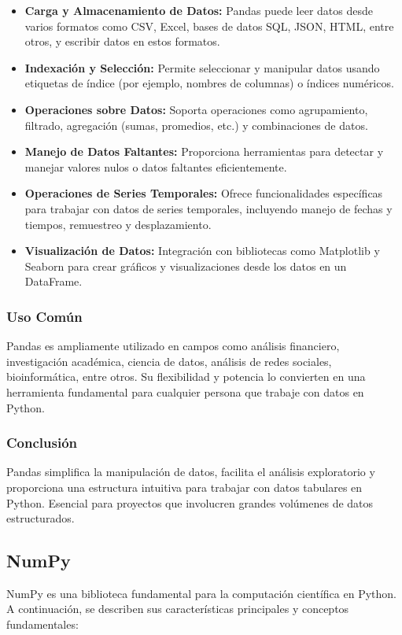 \documentclass[conference]{IEEEtran}
\begin{document}
    \begin{itemize}
      \item \textbf{Carga y Almacenamiento de Datos:}
        Pandas puede leer datos desde varios formatos como CSV, Excel, bases de datos SQL, JSON, HTML, entre otros, y escribir datos en estos formatos.
      \item \textbf{Indexación y Selección:}
        Permite seleccionar y manipular datos usando etiquetas de índice (por ejemplo, nombres de columnas) o índices numéricos.
      \item \textbf{Operaciones sobre Datos:}
        Soporta operaciones como agrupamiento, filtrado, agregación (sumas, promedios, etc.) y combinaciones de datos.
      \item \textbf{Manejo de Datos Faltantes:}
        Proporciona herramientas para detectar y manejar valores nulos o datos faltantes eficientemente.
      \item \textbf{Operaciones de Series Temporales:}
        Ofrece funcionalidades específicas para trabajar con datos de series temporales, incluyendo manejo de fechas y tiempos, remuestreo y desplazamiento.
      \item \textbf{Visualización de Datos:}
        Integración con bibliotecas como Matplotlib y Seaborn para crear gráficos y visualizaciones desde los datos en un DataFrame.
    \end{itemize}
    
    \subsubsection*{Uso Común}
    Pandas es ampliamente utilizado en campos como análisis financiero, investigación académica, ciencia de datos, análisis de redes sociales, bioinformática, entre otros. Su flexibilidad y potencia lo convierten en una herramienta fundamental para cualquier persona que trabaje con datos en Python.
    
    \subsubsection*{Conclusión}
    Pandas simplifica la manipulación de datos, facilita el análisis exploratorio y proporciona una estructura intuitiva para trabajar con datos tabulares en Python. Esencial para proyectos que involucren grandes volúmenes de datos estructurados.
    
    \subsection{NumPy}
    NumPy es una biblioteca fundamental para la computación científica en Python. A continuación, se describen sus características principales y conceptos fundamentales:
    
\end{document}
